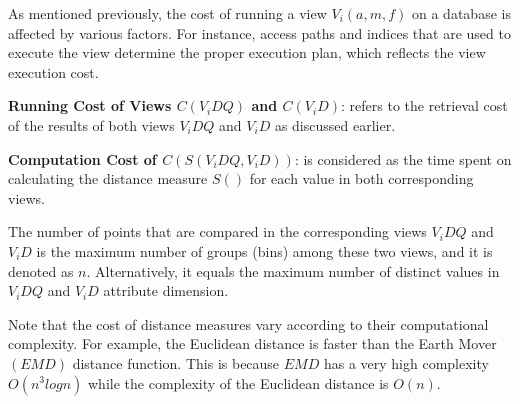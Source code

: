 As mentioned previously, the cost of running a view $V_i(a,m,f)$ on a database is affected by various factors. 
%
For instance, access paths and indices that are used to execute the view determine the proper execution plan, which reflects the view execution cost.
%
%

\noindent \textbf{Running Cost of Views $C(V_i DQ)$ and $C(V_i D)$}: 
%
refers to the retrieval cost of the results of both views $V_i DQ$ and $V_i D$ as discussed earlier. 

%

\noindent \textbf{Computation Cost of $C( S(V_i DQ, V_i D))$}: is considered as the time spent on calculating the distance measure $S()$ for each value in both corresponding views.
%

The number of points that are compared in the corresponding views $V_i DQ$ and $V_i D$ is the maximum number of groups (bins) among these two views, and it is denoted as $n$.
%
Alternatively, it equals the maximum number of distinct values in $V_i DQ$ and $V_i D$ attribute dimension.

%
Note that the cost of distance measures vary according to their computational complexity. 
%
For example, the Euclidean distance is faster than the Earth Mover $(EMD)$ distance function.
%
This is because $EMD$ has a very high complexity $O(n^3 log n )$  \cite{Jang:2011:LAE:2063576.2063652} while the complexity of the Euclidean distance is $O(n)$.
%

